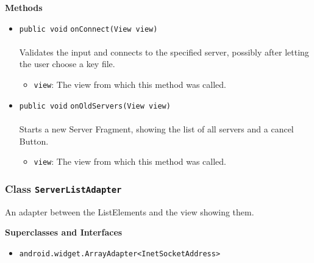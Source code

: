 \textbf{\sffamily Methods}
\begin{itemize}
\item \lstinline|public void| \lstinline|onConnect|\lstinline|(View view)|\\ \\[-0.6em]
Validates the input and connects to the specified server,
 possibly after letting the user choose a key file.
\begin{itemize}
\item \lstinline|view|: The view from which this method was called.
\end{itemize}



\item \lstinline|public void| \lstinline|onOldServers|\lstinline|(View view)|\\ \\[-0.6em]
Starts a new Server Fragment, showing the list of all servers and a cancel Button.
\begin{itemize}
\item \lstinline|view|: The view from which this method was called.
\end{itemize}



\end{itemize}

\subsubsection{Class \lstinline|ServerListAdapter|}
An adapter between the ListElements and the view showing them. \\
\noindent\begin{minipage}[t]{5cm}
\vspace{0.3em}
\hspace*{2em}
\vspace{0.3em}
\end{minipage}



\textbf{\sffamily Superclasses and Interfaces}
\begin{itemize}
\item \lstinline|android.widget.ArrayAdapter<InetSocketAddress>|
\end{itemize}


